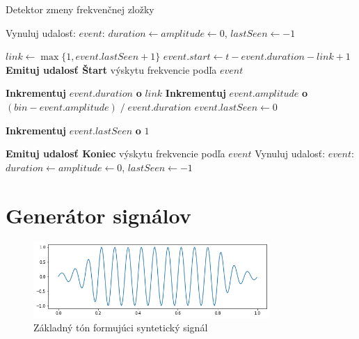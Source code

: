 \begin{algorithm}[h]
\caption{Detektor zmeny frekvenčnej zložky}
\begin{algorithmic}[1]
	\State Vynuluj udalosť: $event$: $duration \gets amplitude \gets 0$, $lastSeen \gets -1$
\EndIf

	\State $link \gets \max\{1, event.lastSeen + 1\}$
		\State $event.start \gets t - event.duration - link + 1$
		\State \textbf{Emituj udalosť Štart} výskytu frekvencie podľa $event$
	\EndIf
	
	\State \textbf{Inkrementuj} $event.duration$ \textbf{o} $link$
	\State \textbf{Inkrementuj} $event.amplitude$ \textbf{o} $(bin - event.amplitude)\;/\;event.duration$
	\State $event.lastSeen \gets 0$

	\State \textbf{Inkrementuj} $event.lastSeen$ \textbf{o}  $1$

        		\State \textbf{Emituj udalosť Koniec} výskytu frekvencie podľa $event$
        	\EndIf
        \Else
        	\State Vynuluj udalosť: $event$: $duration \gets amplitude \gets 0$, $lastSeen \gets -1$
        \EndIf
\EndIf
\end{algorithmic}
\label{algo:event-detector}
\end{algorithm}

\section{Generátor signálov}
\begin{figure}[h]
   \centering
    \includegraphics[width=0.8\textwidth]{figures/verification/fade-in-sinusoid.png}
   \caption{Základný tón formujúci syntetický signál}
\end{figure} 



